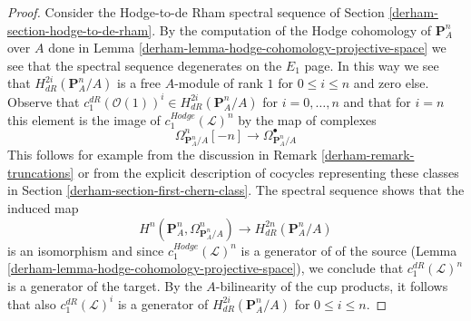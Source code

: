 \begin{proof}

Consider the Hodge-to-de Rham spectral sequence of
Section \ref{derham-section-hodge-to-de-rham}.
By the computation of the Hodge cohomology of $\mathbf{P}^n_A$ over $A$
done in Lemma \ref{derham-lemma-hodge-cohomology-projective-space}
we see that the spectral sequence degenerates on the $E_1$ page.
In this way we see that $H^{2i}_{dR}(\mathbf{P}^n_A/A)$ is a free
$A$-module of rank $1$ for $0 \leq i \leq n$ and zero else.
Observe that $c_1^{dR}(\mathcal{O}(1))^i \in H^{2i}_{dR}(\mathbf{P}^n_A/A)$
for $i = 0, \ldots, n$ and that for $i = n$ this element is the
image of $c_1^{Hodge}(\mathcal{L})^n$ by the map of complexes
$$
\Omega^n_{\mathbf{P}^n_A/A}[-n]
\longrightarrow
\Omega^\bullet_{\mathbf{P}^n_A/A}
$$
This follows for example from the discussion in Remark \ref{derham-remark-truncations}
or from the explicit description of cocycles representing these classes in
Section \ref{derham-section-first-chern-class}.
The spectral sequence shows that the induced map
$$
H^n(\mathbf{P}^n_A, \Omega^n_{\mathbf{P}^n_A/A}) \longrightarrow
H^{2n}_{dR}(\mathbf{P}^n_A/A)
$$
is an isomorphism and since $c_1^{Hodge}(\mathcal{L})^n$ is a generator of
of the source (Lemma \ref{derham-lemma-hodge-cohomology-projective-space}),
we conclude that $c_1^{dR}(\mathcal{L})^n$ is a generator
of the target. By the $A$-bilinearity of the cup products,
it follows that also $c_1^{dR}(\mathcal{L})^i$
is a generator of $H^{2i}_{dR}(\mathbf{P}^n_A/A)$ for
$0 \leq i \leq n$.
\end{proof}

